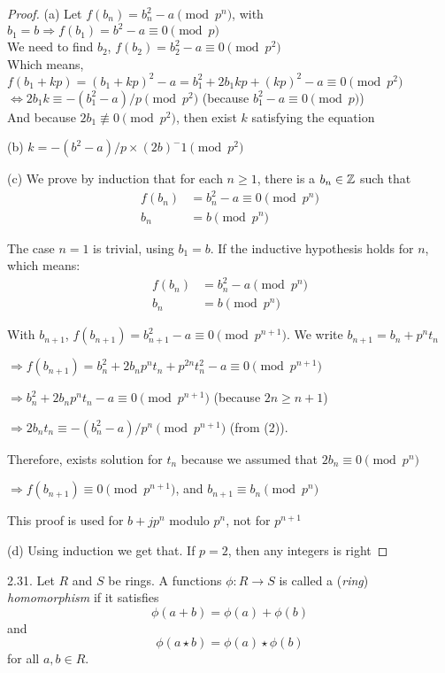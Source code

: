 \begin{proof}
    (a) Let $f(b_n)=b_n^2-a \pmod{p^n}$, with $b_1=b \Rightarrow f(b_1)=b^2-a\equiv 0 \pmod p$ \\ We need to find $b_2$, $f(b_2)=b_2^2-a \equiv 0 \pmod{p^2}$ \\ Which means, $f(b_1+kp)=(b_1+kp)^2-a=b_1^2+2b_1kp+(kp)^2-a \equiv 0 \pmod{p^2}$ \\ $\Leftrightarrow 2b_1k \equiv -(b_1^2-a)/p \pmod{p^2}$ (because $b_1^2-a \equiv 0 \pmod p$) \\ And because $2b_1 \not\equiv 0 \pmod{p^2}$, then exist $k$ satisfying the equation

    (b) $k=-(b^2-a)/p \times (2b)^-1 \pmod{p^2}$

    (c) We prove by induction that for each $n \geq 1$, there is a $b_n \in \mathbb{Z}$ such that
    \begin{align*}
        f(b_n) & =b_n^2-a \equiv 0 \pmod{p^n} \\
        b_n & = b \pmod{p^n}
    \end{align*}

    The case $n=1$ is trivial, using $b_1=b$. If the inductive hypothesis holds for $n$, which means:     
    \begin{align*}
        f(b_n) & = b_n^2 - a \pmod{p^n} \\
        b_n & = b \pmod{p^n} 
    \end{align*}

    With $b_{n+1}$, $f(b_{n+1})=b_{n+1}^2-a \equiv 0 \pmod{p^{n+1}}$. We write $b_{n+1}=b_n+p^nt_n$
    
    $\Rightarrow  f(b_{n+1})=b_n^2+2b_np^nt_n+p^{2n}t_n^2 - a \equiv 0 \pmod{p^{n+1}}$

    $\Rightarrow b_n^2+2b_np^nt_n-a \equiv 0 \pmod{p^{n+1}}$ (because $2n \geq n+1$)
    
    $\Rightarrow 2 b_n t_n \equiv -(b_n^2-a)/p^n \pmod{p^{n+1}}$ (from (2)). 
    
    Therefore, exists solution for $t_n$ because we assumed that $2b_n \equiv 0 \pmod{p^{n}}$
    
    $\Rightarrow f(b_{n+1}) \equiv 0 \pmod{p^{n+1}}$, and $b_{n+1} \equiv b_n \pmod{p^n}$
    
    This proof is used for $b+jp^n$ modulo $p^n$, not for $p^{n+1}$

    (d) Using induction we get that. If $p=2$, then any integers is right
\end{proof}

2.31. Let $R$ and $S$ be rings. A functions 
    $\phi: R \rightarrow S$ is called a (\textit{ring}) \textit{homomorphism} if it satisfies 
    \[\phi(a+b)=\phi(a) + \phi(b)\] and \[ \phi(a \star b) = \phi(a) \star \phi(b)\] for all $a, b \in R$.

